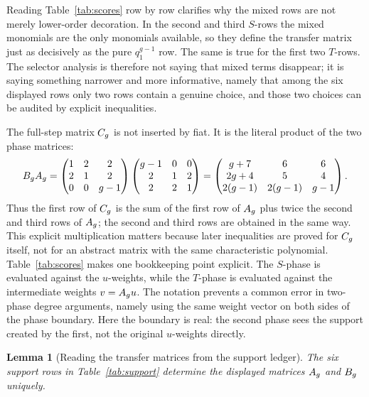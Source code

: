 \documentclass[11pt]{article}
\newtheorem{lemma}[theorem]{Lemma}
\theoremstyle{remark}
\numberwithin{equation}{section}
\begin{document}
Reading Table~\ref{tab:scores} row by row clarifies why the mixed rows are not
merely lower-order decoration.  In the second and third \(S\)-rows the mixed
monomials are the only monomials available, so they define the transfer matrix
just as decisively as the pure \(q_1^{g-1}\) row.  The same is true for the
first two \(T\)-rows.  The selector analysis is therefore not saying that mixed
terms disappear; it is saying something narrower and more informative, namely
that among the six displayed rows only two rows contain a genuine choice, and
those two choices can be audited by explicit inequalities.

The full-step matrix \(C_g\) is not inserted by fiat.  It is the literal
product of the two phase matrices:
\[
B_gA_g=
\begin{pmatrix}
1&2&2\\
2&1&2\\
0&0&g-1
\end{pmatrix}
\begin{pmatrix}
g-1&0&0\\
2&1&2\\
2&2&1
\end{pmatrix}
=
\begin{pmatrix}
g+7&6&6\\
2g+4&5&4\\
2(g-1)&2(g-1)&g-1
\end{pmatrix}.
\]
Thus the first row of \(C_g\) is the sum of the first row of \(A_g\) plus twice
the second and third rows of \(A_g\); the second and third rows are obtained in
the same way.  This explicit multiplication matters because later inequalities
are proved for \(C_g\) itself, not for an abstract matrix with the same
characteristic polynomial.
Table~\ref{tab:scores} makes one bookkeeping point explicit.  The \(S\)-phase
is evaluated against the \(u\)-weights, while the \(T\)-phase is evaluated
against the intermediate weights \(v=A_g u\).  The notation prevents a common
error in two-phase degree arguments, namely using the same weight vector on both
sides of the phase boundary.  Here the boundary is real: the second phase sees
the support created by the first, not the original \(u\)-weights directly.

\begin{lemma}[Reading the transfer matrices from the support ledger]\label{lem:matrix-read}
The six support rows in Table~\ref{tab:support} determine the displayed
matrices \(A_g\) and \(B_g\) uniquely.
\end{lemma}
\end{document}
